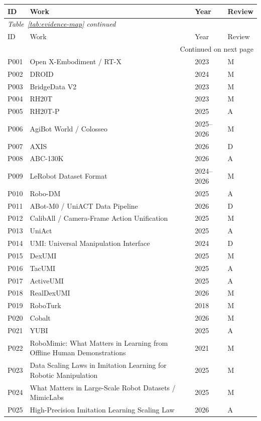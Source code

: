 \begin{longtable}{@{}p{1.3cm}p{11.8cm}p{2.2cm}p{1.2cm}@{}}
\toprule
ID & Work & Year & Review \\
\midrule
\endfirsthead
\multicolumn{4}{l}{\small\itshape Table~\ref{tab:evidence-map} continued}\\
\toprule
ID & Work & Year & Review \\
\midrule
\endhead
\midrule
\multicolumn{4}{r}{\small Continued on next page}\\
\endfoot
\bottomrule
\endlastfoot
P001 & Open X-Embodiment / RT-X & 2023 & M \\
P002 & DROID & 2024 & M \\
P003 & BridgeData V2 & 2023 & M \\
P004 & RH20T & 2023 & M \\
P005 & RH20T-P & 2025 & A \\
P006 & AgiBot World / Colosseo & 2025–2026 & M \\
P007 & AXIS & 2026 & D \\
P008 & ABC-130K & 2026 & A \\
P009 & LeRobot Dataset Format & 2024–2026 & M \\
P010 & Robo-DM & 2025 & A \\
P011 & ABot-M0 / UniACT Data Pipeline & 2026 & D \\
P012 & CalibAll / Camera-Frame Action Unification & 2025 & M \\
P013 & UniAct & 2025 & A \\
P014 & UMI: Universal Manipulation Interface & 2024 & D \\
P015 & DexUMI & 2025 & M \\
P016 & TacUMI & 2025 & A \\
P017 & ActiveUMI & 2025 & A \\
P018 & RealDexUMI & 2026 & M \\
P019 & RoboTurk & 2018 & M \\
P020 & Cobalt & 2026 & M \\
P021 & YUBI & 2025 & A \\
P022 & RoboMimic: What Matters in Learning from Offline Human Demonstrations & 2021 & M \\
P023 & Data Scaling Laws in Imitation Learning for Robotic Manipulation & 2025 & M \\
P024 & What Matters in Large-Scale Robot Datasets / MimicLabs & 2025 & M \\
P025 & High-Precision Imitation Learning Scaling Law & 2026 & A \\

\end{longtable}
